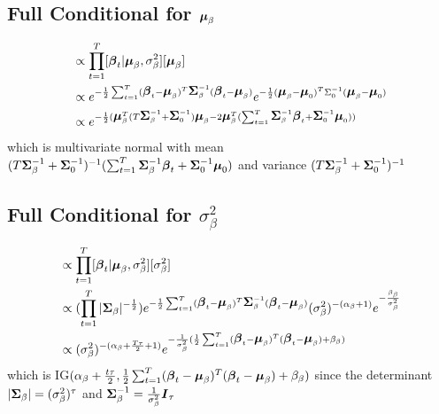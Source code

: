 \documentclass[fleqn]{article}
\def\bm#1{\mbox{\boldmath $#1$}}
\begin{document}
\subsection{Full Conditional for $\bm{\mu}_\beta$}
%
\begin{align*}
[\bm{\mu}_\beta | \cdot] & \propto \prod_{t = 1}^T [\bm{\beta}_t | \bm{\mu}_\beta, \sigma^2_\beta] [\bm{\mu}_\beta]\\
%
& \propto e^{ - \frac{1} {2} \sum_{t = 1}^T (\bm{\beta}_t - \bm{\mu}_\beta)^T \bm{\Sigma}_\beta^{ - 1} (\bm{\beta}_t - \bm{\mu}_\beta)} e^{ - \frac{1} {2} (\bm{\mu}_\beta - \bm{\mu}_0)^T \Sigma_0^{ - 1} (\bm{\mu}_\beta - \bm{\mu}_0)}\\
%
& \propto e^{ - \frac{1} {2} (
\bm{\mu}_\beta^T (T \bm{\Sigma}_\beta^{ - 1} + \bm{\Sigma}_0^{ - 1}) \bm{\mu}_\beta - 2 \bm{\mu}_\beta^T (\sum_{t = 1}^T \bm{\Sigma}_\beta^{ - 1} \bm{\beta}_t + \bm{\Sigma}_0^{ - 1} \bm{\mu}_0) ) }
\end{align*}
%
which is multivariate normal with mean
$(T \bm{\Sigma}_\beta^{ - 1} + \bm{\Sigma}_0^{ - 1})^{ - 1} (\sum_{t = 1}^T \bm{\Sigma}_\beta^{ - 1} \bm{\beta}_t + \bm{\Sigma}_0^{ - 1} \bm{\mu}_0)$ and variance $(T \bm{\Sigma}_\beta^{ - 1} + \bm{\Sigma}_0^{ - 1})^{ - 1}$
%
\subsection{Full Conditional for $\sigma^2_\beta$}
%
\begin{align*}
[\sigma^2_\beta | \cdot] & \propto \prod_{t = 1}^T [\bm{\beta}_t | \bm{\mu}_\beta, \sigma^2_\beta] [\sigma^2_\beta]\\
%
& \propto (\prod_{t = 1}^T |\bm{\Sigma}_\beta|^{ - \frac{1} {2}}) e^{ - \frac{1} {2} \sum_{t = 1}^T (\bm{\beta}_t - \bm{\mu}_\beta)^T \bm{\Sigma}_\beta^{ - 1} (\bm{\beta}_t - \bm{\mu}_\beta)} (\sigma^2_\beta)^{ - (\alpha_\beta + 1)} e^{ - \frac{\beta_\beta} {\sigma^2_\beta}}\\
%
& \propto (\sigma^2_\beta)^{ - (\alpha_\beta + \frac{T \tau} {2} + 1)} e^{ - \frac{1} {\sigma^2_\beta} (\frac{1} {2} \sum_{t = 1}^T (\bm{\beta}_t - \bm{\mu}_\beta)^T (\bm{\beta}_t - \bm{\mu}_\beta) + \beta_\beta)}
\end{align*}
%
which is IG$(\alpha_\beta + \frac{t \tau} {2}, \frac{1} {2} \sum_{t = 1}^T (\bm{\beta}_t - \bm{\mu}_\beta)^T (\bm{\beta}_t - \bm{\mu}_\beta) + \beta_\beta)$ since the determinant $|\bm{\Sigma}_\beta| = (\sigma^2_\beta)^\tau$ and $\bm{\Sigma}_\beta^{ - 1} = \frac{1} {\sigma^2_\beta} \bm{I}_\tau$
%
\end{document}
